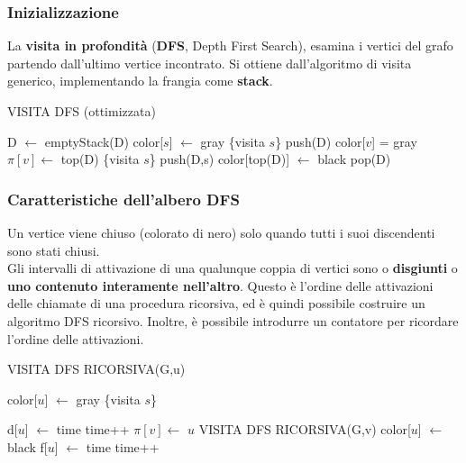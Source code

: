 \documentclass[11pt]{article}
\theoremstyle{proprietà}
\begin{document}
\subsubsection{Inizializzazione}
La \textbf{visita in profondità} (\textbf{DFS}, Depth First Search), esamina i vertici del grafo partendo dall'ultimo 
vertice incontrato. Si ottiene dall'algoritmo di visita generico, implementando la frangia come \textbf{stack}.
\begin{algorithm}
    \caption{VISITA DFS (ottimizzata)}
    \begin{algorithmic}
        \State D $\gets$ emptyStack(D)
        \State color[$s$] $\gets$ gray
        \State \{visita $s$\}
        \State push(D)
                \State color[$v$] = gray 
                \State $\pi[v] \gets$ top(D) 
                \State \{visita $s$\}
                \State push(D,s)
            \EndIf 
            \State color[top(D)] $\gets$ black
            \State pop(D)
        \EndWhile
    \end{algorithmic}
\end{algorithm}
\subsubsection{Caratteristiche dell'albero DFS}
Un vertice viene chiuso (colorato di nero) solo quando tutti i suoi discendenti sono stati chiusi.\\
Gli intervalli di attivazione di una qualunque coppia di vertici sono o \textbf{disgiunti} o \textbf{uno contenuto interamente 
nell'altro}. Questo è l'ordine delle attivazioni delle chiamate di una procedura ricorsiva, ed è quindi possibile costruire 
un algoritmo DFS ricorsivo. Inoltre, è possibile introdurre un contatore per ricordare l'ordine delle attivazioni.
\begin{algorithm}[H]
    \caption{VISITA DFS RICORSIVA(G,u)}
    \begin{algorithmic}
        \State color[$u$] $\gets$ gray
        \State \{visita $s$\}
    \end{algorithmic}
\end{algorithm}
\begin{algorithm}[H]
    \begin{algorithmic}
        \State d[$u$] $\gets$ time
        \State time++
                \State $\pi[v] \gets$ $u$
                \State VISITA DFS RICORSIVA(G,v)
            \EndIf 
            \State color[$u$] $\gets$ black
            \State f[$u$] $\gets$ time
            \State time++
        \EndFor
    \end{algorithmic}
\end{algorithm}
\end{document}
